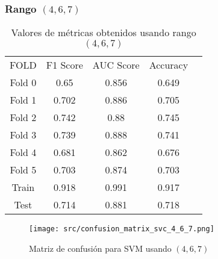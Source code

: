 \subsubsection*{Rango $(4,6,7)$}
\begin{table}[H]
	\centering
	\begin{tabular}{|c|c|c|c|c}
		\cline{1-4}
		FOLD   & F1 Score & AUC Score & Accuracy \\ \cline{1-4}
		Fold 0 & 0.65     & 0.856     & 0.649    \\  \cline{1-4}
		Fold 1 & 0.702    & 0.886     & 0.705    \\  \cline{1-4}
		Fold 2 & 0.742    & 0.88      & 0.745    \\  \cline{1-4}
		Fold 3 & 0.739    & 0.888     & 0.741    \\  \cline{1-4}
		Fold 4 & 0.681    & 0.862     & 0.676    \\  \cline{1-4}
		Fold 5 & 0.703    & 0.874     & 0.703    \\  \cline{1-4}
		Train  & 0.918    & 0.991     & 0.917    \\  \cline{1-4}
		Test   & 0.714    & 0.881     & 0.718    \\  \cline{1-4}
	\end{tabular}
	\caption{Valores de métricas obtenidos usando rango $(4,6,7)$}
\end{table}
\begin{figure}[H]
	\centering
	\texttt{[image: src/confusion\_matrix\_svc\_4\_6\_7.png]}
	\caption{Matriz de confusión para SVM usando $(4,6,7)$}
	\label{fig:confusion_matrix_svc2}
\end{figure}

